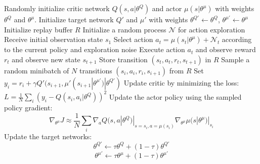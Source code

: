 \documentclass{article} %
\begin{document}
\begin{algorithm}[h]
  \caption{DDPG algorithm \label{algo:ddpg}}
  \label{dpgalgo}
  \begin{algorithmic}
    \STATE Randomly initialize critic network $Q(s, a | \theta^Q)$ and actor
    $\mu(s | \theta^{\mu})$ with weights $\theta^{Q}$ and $\theta^{\mu}$.
    \STATE Initialize target network $Q'$ and $\mu'$ with weights $\theta^{Q'}
    \leftarrow \theta^{Q}$, $\theta^{\mu'} \leftarrow \theta^{\mu}$
    \STATE Initialize replay buffer $R$
      \STATE Initialize a random process $\mathcal{N}$ for action
      exploration
      \STATE Receive initial observation state $s_1$
        \STATE Select action $a_t = \mu(s_t | \theta^{\mu}) + \mathcal{N}_t$
        according to the current policy and exploration noise
        \STATE Execute action $a_t$ and observe
        reward $r_t$ and observe new state $s_{t+1}$
        \STATE Store transition $(s_t, a_t,
                r_t, s_{t+1})$ in $R$
        \STATE Sample a random minibatch of $N$ transitions
               $(s_i, a_i,
        r_i, s_{i + 1})$ from $R$
        \STATE Set $ y_i = r_i + \gamma Q'(s_{i + 1},
        \mu'(s_{i+1} | \theta^{\mu'}) | \theta^{Q'}) $
        \STATE Update critic by minimizing the loss:
               $L = \frac{1}{N} \sum_i (y_i -
               Q(s_i, a_i | \theta^Q))^2$
        \STATE Update the actor policy using the sampled policy gradient:
        \begin{equation*}
            \nabla_{\theta^{\mu}} J \approx
            \frac{1}{N} \sum_i
               \nabla_{a} Q(s, a | \theta^Q)|_{s = s_i, a = \mu(s_i)}
               \nabla_{\theta^\mu} \mu(s | \theta^\mu)|_{s_i}
         \end{equation*}
        \STATE Update the target networks:
          \begin{equation*}
            \theta^{Q'} \leftarrow \tau \theta^{Q} + (1 - \tau) \theta^{Q'}
          \end{equation*}
          \begin{equation*}
            \theta^{\mu'} \leftarrow \tau \theta^{\mu} +
                (1 - \tau) \theta^{\mu'}
          \end{equation*}
        \ENDFOR
    \ENDFOR
  \end{algorithmic}
\end{algorithm}
\end{document}
